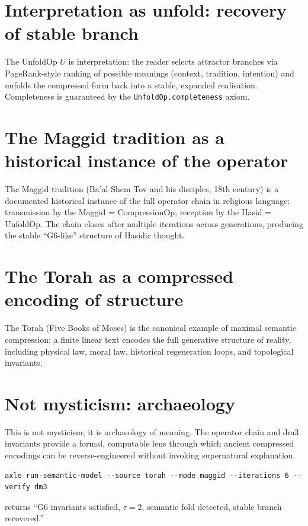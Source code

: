 \section{Interpretation as unfold: recovery of stable branch}

The UnfoldOp \(U\) is interpretation: the reader selects attractor branches via PageRank-style ranking of possible meanings (context, tradition, intention) and unfolds the compressed form back into a stable, expanded realisation. Completeness is guaranteed by the \texttt{UnfoldOp.completeness} axiom.

\section{The Maggid tradition as a historical instance of the operator}

The Maggid tradition (Ba'al Shem Tov and his disciples, 18th century) is a documented historical instance of the full operator chain in religious language: transmission by the Maggid = CompressionOp; reception by the Hasid = UnfoldOp. The chain closes after multiple iterations across generations, producing the stable ``G6-like'' structure of Hasidic thought.

\section{The Torah as a compressed encoding of structure}

The Torah (Five Books of Moses) is the canonical example of maximal semantic compression: a finite linear text encodes the full generative structure of reality, including physical law, moral law, historical regeneration loops, and topological invariants.

\section{Not mysticism: archaeology}

This is not mysticism; it is archaeology of meaning. The operator chain and dm3 invariants provide a formal, computable lens through which ancient compressed encodings can be reverse-engineered without invoking supernatural explanation.

\begin{verbatim}
axle run-semantic-model --source torah --mode maggid --iterations 6 --verify dm3
\end{verbatim}
returns ``G6 invariants satisfied, \(\tau=2\), semantic fold detected, stable branch recovered.''

